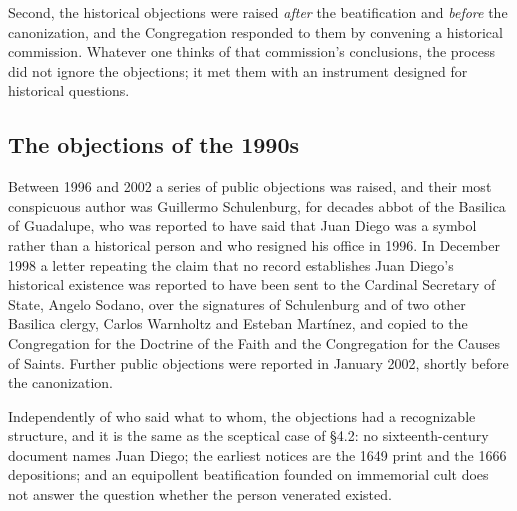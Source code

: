 Second, the historical objections were raised \emph{after} the
beatification and \emph{before} the canonization, and the Congregation
responded to them by convening a historical commission. Whatever one
thinks of that commission's conclusions, the process did not ignore
the objections; it met them with an instrument designed for
historical questions.

\subsection{The objections of the 1990s}

Between 1996 and 2002 a series of public objections was raised, and
their most conspicuous author was Guillermo Schulenburg, for decades
abbot of the Basilica of Guadalupe, who was reported to have said
that Juan Diego was a symbol rather than a historical person and who
resigned his office in 1996. In December 1998 a letter repeating the
claim that no record establishes Juan Diego's historical existence
was reported to have been sent to the Cardinal Secretary of State,
Angelo Sodano, over the signatures of Schulenburg and of two other
Basilica clergy, Carlos Warnholtz and Esteban Mart\'inez, and copied
to the Congregation for the Doctrine of the Faith and the
Congregation for the Causes of Saints. Further public objections were
reported in January 2002, shortly before the
canonization.

Independently of who said what to whom, the objections had a
recognizable structure, and it is the same as the sceptical case of
\S4.2: no sixteenth-century document names Juan Diego; the earliest
notices are the 1649 print and the 1666 depositions; and an
equipollent beatification founded on immemorial cult does not answer
the question whether the person venerated existed.

